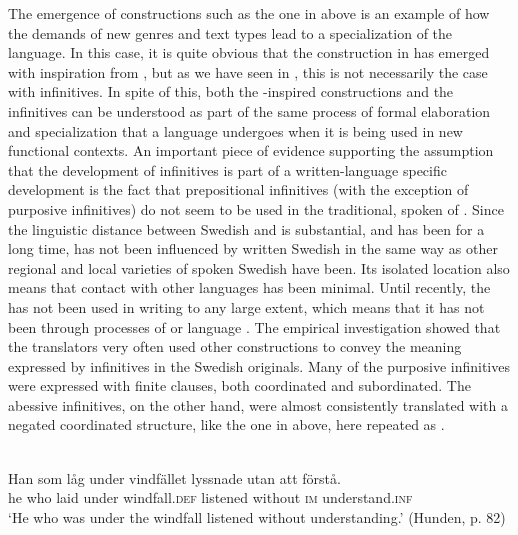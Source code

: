 \documentclass[output=paper]{langscibook}
\begin{document}
The emergence of constructions such as the one in  above is an example of how the demands of new genres and text types lead to a specialization of the language. In this case, it is quite obvious that the construction in  has emerged with inspiration from , but as we have seen in , this is not necessarily the case with  infinitives. In spite of this, both the -inspired constructions and the  infinitives can be understood as part of the same process of formal elaboration and specialization that a language undergoes when it is being used in new functional contexts. An important piece of evidence supporting the assumption that the development of  infinitives is part of a written-language specific development is the fact that prepositional  infinitives (with the exception of purposive infinitives) do not seem to be used in the traditional, spoken  of . Since the linguistic distance between Swedish and  is substantial, and has been for a long time,  has not been influenced by written Swedish in the same way as other regional and local varieties of spoken Swedish have been. Its isolated location also means that contact with other languages has been minimal. Until recently, the  has not been used in writing to any large extent, which means that it has not been through processes of  or language . The empirical investigation showed that the  translators very often used other constructions to convey the meaning expressed by  infinitives in the Swedish originals. Many of the purposive infinitives were expressed with finite clauses, both coordinated and subordinated. The abessive infinitives, on the other hand, were almost consistently translated with a negated coordinated structure, like the one in  above, here repeated as .


\ea
\label{ex:kalm:35}
\ea {} \\
\gll Han som låg under vindfället lyssnade utan att förstå.\\
 he who laid under windfall.\textsc{def} listened without \textsc{im} understand.\textsc{inf}\\
\glt ‘He who was under the windfall listened without understanding.’ (Hunden, p. 82)
\end{document}
